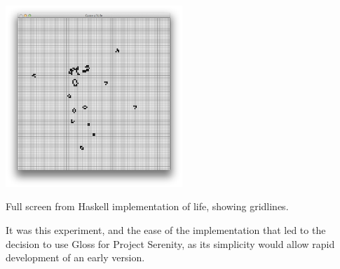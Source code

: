\begin{marginfigure}
	\hspace{-1em}\includegraphics[width=18em]{res/conway/life.png}
	\caption[Full screen from Haskell implementation of Life]{Full screen from Haskell implementation of life, showing gridlines.}
	\label{fig:life}
\end{marginfigure}

It was this experiment, and the ease of the implementation that led to the decision to use Gloss for Project Serenity, as its simplicity would allow rapid development of an early version.
